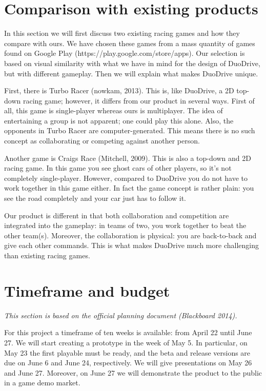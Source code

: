 \documentclass[11pt,twoside,a4paper]{article}
\begin{document}
\section{Comparison with existing products}
In this section we will first discuss two existing racing games and how they compare with ours. We have chosen these games from a mass quantity of games found on Google Play (https://play.google.com/store/apps). Our selection is based on visual similarity with what we have in mind for the design of DuoDrive, but with different gameplay. Then we will explain what makes DuoDrive unique.

First, there is Turbo Racer (nowkam, 2013). This is, like DuoDrive, a 2D top-down racing game; however, it differs from our product in several ways. First of all, this game is single-player whereas ours is multiplayer. The idea of entertaining a group is not apparent; one could play this alone. Also, the opponents in Turbo Racer are computer-generated. This means there is no such concept as collaborating or competing against another person.

Another game is Craigs Race (Mitchell, 2009). This is also a top-down and 2D racing game. In this game you see ghost cars of other players, so it's not completely single-player. However, compared to DuoDrive you do not have to work together in this game either. In fact the game concept is rather plain: you see the road completely and your car just has to follow it.

Our product is different in that both collaboration and competition are integrated into the gameplay: in teams of two, you work together to beat the other team(s). Moreover, the collaboration is physical: you are back-to-back and give each other commands. This is what makes DuoDrive much more challenging than existing racing games.


\section{Timeframe and budget}
{\itshape This section is based on the official planning document (Blackboard 2014).}

For this project a timeframe of ten weeks is available: from April 22 until June 27. We will start creating a prototype in the week of May 5. In particular, on May 23 the first playable must be ready, and the beta and release versions are due on June 6 and June 24, respectively. We will give presentations on May 26 and June 27. Moreover, on June 27 we will demonstrate the product to the public in a game demo market.
\end{document}

